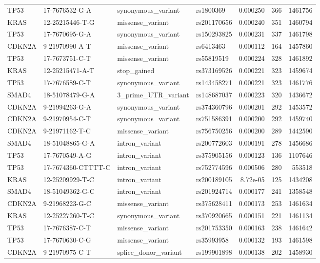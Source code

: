 \begin{footnotesize}
\begin{longtable}{llllrrr}
TP53 & 17-7676532-G-A & synonymous\_variant & rs1800369 & 0.000250 & 366 & 1461756 \\
KRAS & 12-25215446-T-G & missense\_variant & rs201170656 & 0.000240 & 351 & 1460794 \\
TP53 & 17-7670695-G-A & synonymous\_variant & rs150293825 & 0.000231 & 337 & 1461798 \\
CDKN2A & 9-21970990-A-T & missense\_variant & rs6413463 & 0.000112 & 164 & 1457860 \\
TP53 & 17-7673751-C-T & missense\_variant & rs55819519 & 0.000224 & 328 & 1461892 \\
KRAS & 12-25215471-A-T & stop\_gained & rs373169526 & 0.000221 & 323 & 1459674 \\
TP53 & 17-7676589-C-T & synonymous\_variant & rs143458271 & 0.000221 & 323 & 1461776 \\
SMAD4 & 18-51078479-G-A & 3\_prime\_UTR\_variant & rs148687037 & 0.000223 & 320 & 1436672 \\
CDKN2A & 9-21994263-G-A & synonymous\_variant & rs374360796 & 0.000201 & 292 & 1453572 \\
CDKN2A & 9-21970954-C-T & synonymous\_variant & rs751586391 & 0.000200 & 292 & 1459740 \\
CDKN2A & 9-21971162-T-C & missense\_variant & rs756750256 & 0.000200 & 289 & 1442590 \\
SMAD4 & 18-51048865-G-A & intron\_variant & rs200772603 & 0.000191 & 278 & 1456686 \\
TP53 & 17-7670549-A-G & intron\_variant & rs375905156 & 0.000123 & 136 & 1107646 \\
TP53 & 17-7674360-CTTTT-C & intron\_variant & rs752774596 & 0.000506 & 280 & 553518 \\
KRAS & 12-25209929-T-C & intron\_variant & rs200189105 & 8.72e-05 & 125 & 1434208 \\
SMAD4 & 18-51049362-G-C & intron\_variant & rs201924714 & 0.000177 & 241 & 1358548 \\
CDKN2A & 9-21968223-G-C & missense\_variant & rs375628411 & 0.000173 & 253 & 1461634 \\
KRAS & 12-25227260-T-C & synonymous\_variant & rs370920665 & 0.000151 & 221 & 1461134 \\
TP53 & 17-7676387-C-T & missense\_variant & rs201753350 & 0.000163 & 238 & 1461642 \\
TP53 & 17-7670630-C-G & missense\_variant & rs35993958 & 0.000132 & 193 & 1461598 \\
CDKN2A & 9-21970975-C-T & splice\_donor\_variant & rs199901898 & 0.000138 & 202 & 1458930 \\

\end{longtable}
\end{footnotesize}

